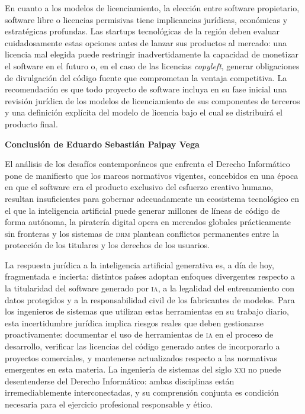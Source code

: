 \documentclass[11pt,a4paper]{report}
\begin{document}
En cuanto a los modelos de licenciamiento, la elección entre software propietario, software libre o licencias permisivas tiene implicancias jurídicas, económicas y estratégicas profundas. Las startups tecnológicas de la región deben evaluar cuidadosamente estas opciones antes de lanzar sus productos al mercado: una licencia mal elegida puede restringir inadvertidamente la capacidad de monetizar el software en el futuro o, en el caso de las licencias \textit{copyleft}, generar obligaciones de divulgación del código fuente que comprometan la ventaja competitiva. La recomendación es que todo proyecto de software incluya en su fase inicial una revisión jurídica de los modelos de licenciamiento de sus componentes de terceros y una definición explícita del modelo de licencia bajo el cual se distribuirá el producto final.

\vspace{0.8cm}

\noindent\textbf{Conclusión de Eduardo Sebastián Paipay Vega}

\smallskip

El análisis de los desafíos contemporáneos que enfrenta el Derecho Informático pone de manifiesto que los marcos normativos vigentes, concebidos en una época en que el software era el producto exclusivo del esfuerzo creativo humano, resultan insuficientes para gobernar adecuadamente un ecosistema tecnológico en el que la inteligencia artificial puede generar millones de líneas de código de forma autónoma, la piratería digital opera en mercados globales prácticamente sin fronteras y los sistemas de \textsc{drm} plantean conflictos permanentes entre la protección de los titulares y los derechos de los usuarios.

La respuesta jurídica a la inteligencia artificial generativa es, a día de hoy, fragmentada e incierta: distintos países adoptan enfoques divergentes respecto a la titularidad del software generado por \textsc{ia}, a la legalidad del entrenamiento con datos protegidos y a la responsabilidad civil de los fabricantes de modelos. Para los ingenieros de sistemas que utilizan estas herramientas en su trabajo diario, esta incertidumbre jurídica implica riesgos reales que deben gestionarse proactivamente: documentar el uso de herramientas de \textsc{ia} en el proceso de desarrollo, verificar las licencias del código generado antes de incorporarlo a proyectos comerciales, y mantenerse actualizados respecto a las normativas emergentes en esta materia. La ingeniería de sistemas del siglo \textsc{xxi} no puede desentenderse del Derecho Informático: ambas disciplinas están irremediablemente interconectadas, y su comprensión conjunta es condición necesaria para el ejercicio profesional responsable y ético.
\end{document}
